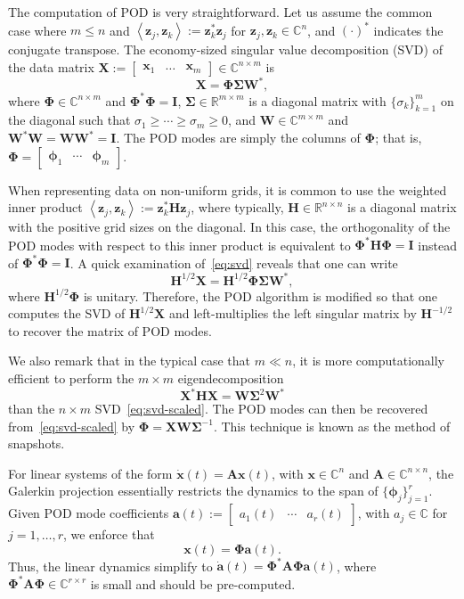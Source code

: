 \documentclass[11pt]{article}
\newcommand*{\Complex}{\mathbb{C}}
\newcommand*{\Reals}{\mathbb{R}}
\newcommand*{\half}{^{1/2}}
\newcommand*{\invhalf}{^{-1/2}}
\newcommand*{\ip}[2]{\left<#1, #2\right>}
\newcommand*{\A}{\mathbf{A}}
\renewcommand*{\H}{\mathbf{H}}
\newcommand*{\I}{\mathbf{I}}
\newcommand*{\X}{\mathbf{X}}
\newcommand*{\W}{\mathbf{W}}
\newcommand*{\PHI}{\mathbf{\Phi}}
\newcommand*{\SIGMA}{\mathbf{\Sigma}}
\renewcommand*{\a}{\mathbf{a}}
\newcommand*{\x}{\mathbf{x}}
\newcommand*{\z}{\mathbf{z}}
\newcommand*{\phiv}{\bm{\phi}}
\begin{document}
The computation of POD is very straightforward.
Let us assume the common case where $m \le n$ and $\ip{\z_j}{\z_k} := \z_k^* \z_j$ for $\z_j, \z_k \in \Complex^n$, and $(\cdot)^*$ indicates the conjugate transpose.
The economy-sized singular value decomposition (SVD) of the data matrix $\X := \begin{bmatrix} \x_1 & \ldots & \x_m \end{bmatrix} \in \Complex^{n \times m}$ is
\begin{equation}
    \label{eq:svd}
    \X = \PHI \SIGMA \W^*,
\end{equation}
where $\PHI \in \Complex^{n \times m}$ and $\PHI^* \PHI = \I$, $\SIGMA \in \Reals^{m \times m}$ is a diagonal matrix with $\{\sigma_k\}_{k=1}^m$ on the diagonal such that $\sigma_1 \ge \cdots \ge \sigma_m \ge 0$, and $\W \in \Complex^{m \times m}$ and $\W^* \W = \W \W^* = \I$.
The POD modes are simply the columns of $\PHI$; that is, $\PHI = \begin{bmatrix} \phiv_1 & \cdots & \phiv_m \end{bmatrix}$.

When representing data on non-uniform grids, it is common to use the weighted inner product $\ip{\z_j}{\z_k} := \z_k^* \H \z_j$, where typically, $\H \in \Reals^{n \times n}$ is a diagonal matrix with the positive grid sizes on the diagonal.
In this case, the orthogonality of the POD modes with respect to this inner product is equivalent to $\PHI^* \H \PHI = \I$ instead of $\PHI^* \PHI = \I$.
A quick examination of~\eqref{eq:svd} reveals that one can write
\begin{equation}
    \label{eq:svd-scaled}
    \H\half \X = \H\half \PHI \SIGMA \W^*,
\end{equation}
where $\H\half \PHI$ is unitary.
Therefore, the POD algorithm is modified so that one computes the SVD of $\H\half \X$ and left-multiplies the left singular matrix by $\H\invhalf$ to recover the matrix of POD modes.

We also remark that in the typical case that $m \ll n$, it is more computationally efficient to perform the $m \times m$ eigendecomposition
\begin{equation}
    \X^* \H \X = \W \SIGMA^2 \W^*
\end{equation}
than the $n \times m$ SVD~\eqref{eq:svd-scaled}.
The POD modes can then be recovered from~\eqref{eq:svd-scaled} by $\PHI = \X \W \SIGMA^{-1}$.
This technique is known as the method of snapshots.

For linear systems of the form $\dot{\x}(t) = \A \x(t)$, with $\x \in \Complex^n$ and $\A \in \Complex^{n \times n}$, the Galerkin projection essentially restricts the dynamics to the span of $\{\phiv_j\}_{j=1}^r$.
Given POD mode coefficients $\a(t) := \begin{bmatrix} a_1(t) & \cdots & a_r(t) \end{bmatrix}$, with $a_j \in \Complex$ for $j = 1, \ldots, r$, we enforce that
\begin{equation}
    \label{eq:projection}
    \x(t) = \PHI \a(t).
\end{equation}
Thus, the linear dynamics simplify to $\dot{\a}(t) = \PHI^* \A \PHI \a(t)$, where $\PHI^* \A \PHI \in \Complex^{r \times r}$ is small and should be pre-computed.
\end{document}
